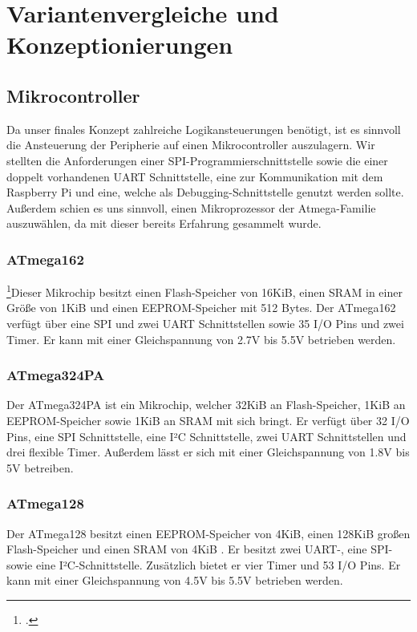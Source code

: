 \section{Variantenvergleiche und Konzeptionierungen}

\subsection{Mikrocontroller}
Da unser finales Konzept zahlreiche Logikansteuerungen benötigt, ist es sinnvoll die Ansteuerung der Peripherie auf einen Mikrocontroller auszulagern.
Wir stellten die Anforderungen einer \acs{SPI}-Programmierschnittstelle sowie die einer doppelt vorhandenen UART Schnittstelle, eine zur Kommunikation mit dem Raspberry Pi und eine, welche als Debugging-Schnittstelle genutzt werden sollte.
Außerdem schien es uns sinnvoll, einen Mikroprozessor der Atmega-Familie auszuwählen, da mit dieser bereits Erfahrung gesammelt wurde.

\subsubsection{ATmega162}
\footcite{AVR-Typen}Dieser Mikrochip besitzt einen Flash-Speicher von 16KiB, einen \acs{SRAM} in einer Größe von 1KiB und einen \acs{EEPROM}-Speicher mit 512 Bytes.
Der ATmega162 verfügt über eine SPI und zwei UART Schnittstellen sowie 35 \acs{I/O} Pins und zwei Timer.
Er kann mit einer Gleichspannung von 2.7V bis 5.5V betrieben werden.

\subsubsection{ATmega324PA}
\footnotemark[1]Der ATmega324PA ist ein Mikrochip, welcher 32KiB an Flash-Speicher, 1KiB an EEPROM-Speicher sowie 1KiB an SRAM mit sich bringt.
Er verfügt über 32 I/O Pins, eine SPI Schnittstelle, eine I²C Schnittstelle, zwei UART Schnittstellen und drei flexible Timer.
Außerdem lässt er sich mit einer Gleichspannung von 1.8V bis 5V betreiben.

\subsubsection{ATmega128}
\footnotemark[1]Der ATmega128 besitzt einen EEPROM-Speicher von 4KiB, einen 128KiB großen Flash-Speicher und einen SRAM von 4KiB .
Er besitzt zwei UART-, eine SPI- sowie eine I²C-Schnittstelle.
Zusätzlich bietet er vier Timer und 53 I/O Pins.
Er kann mit einer Gleichspannung von 4.5V bis 5.5V betrieben werden.

